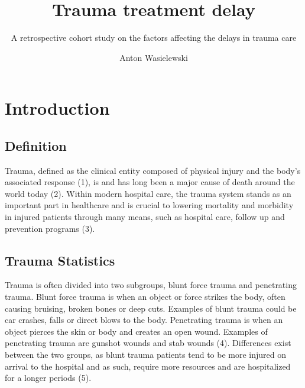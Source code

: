\documentclass[
]{article}
\title{Trauma treatment delay}
\subtitle{A retrospective cohort study on the factors affecting the
delays in trauma care}
\author{Anton Wasielewski}
\date{}
\begin{document}
\maketitle

\hypertarget{introduction}{%
\section{Introduction}\label{introduction}}

\hypertarget{definition}{%
\subsection{Definition}\label{definition}}

Trauma, defined as the clinical entity composed of physical injury and
the body's associated response (1), is and has long been a major cause
of death around the world today (2). Within modern hospital care, the
trauma system stands as an important part in healthcare and is crucial
to lowering mortality and morbidity in injured patients through many
means, such as hospital care, follow up and prevention programs (3).

\hypertarget{trauma-statistics}{%
\subsection{Trauma Statistics}\label{trauma-statistics}}

Trauma is often divided into two subgroups, blunt force trauma and
penetrating trauma. Blunt force trauma is when an object or force
strikes the body, often causing bruising, broken bones or deep cuts.
Examples of blunt trauma could be car crashes, falls or direct blows to
the body. Penetrating trauma is when an object pierces the skin or body
and creates an open wound. Examples of penetrating trauma are gunshot
wounds and stab wounds (4). Differences exist between the two groups, as
blunt trauma patients tend to be more injured on arrival to the hospital
and as such, require more resources and are hospitalized for a longer
periods (5).
\end{document}
